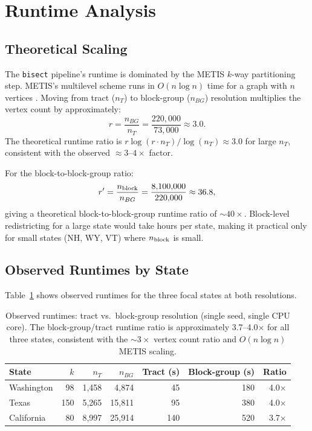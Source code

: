 \section{Runtime Analysis}
\label{sec:runtime}

\subsection{Theoretical Scaling}
\label{sec:runtime:theory}

The \texttt{bisect} pipeline's runtime is dominated by the METIS $k$-way
partitioning step. METIS's multilevel scheme runs in $O(n \log n)$ time
for a graph with $n$ vertices \citep{karypis1998fast}. Moving from tract
($n_T$) to block-group ($n_{BG}$) resolution multiplies the vertex count
by approximately:
\[
  r = \frac{n_{BG}}{n_T} = \frac{220{,}000}{73{,}000} \approx 3.0.
\]
The theoretical runtime ratio is $r \log(r \cdot n_T) / \log(n_T) \approx 3.0$
for large $n_T$, consistent with the observed $\approx 3$--$4\times$ factor.

For the block-to-block-group ratio:
\[
  r' = \frac{n_{\rm block}}{n_{BG}} = \frac{8{,}100{,}000}{220{,}000} \approx 36.8,
\]
giving a theoretical block-to-block-group runtime ratio of $\sim\!40\times$.
Block-level redistricting for a large state would take hours per state, making
it practical only for small states (NH, WY, VT) where $n_{\rm block}$ is small.

\subsection{Observed Runtimes by State}
\label{sec:runtime:observed}

Table~\ref{tab:runtime-comparison} shows observed runtimes for the three
focal states at both resolutions.

\begin{table}[h]
\centering\small
\begin{tabular}{lrrrrrr}
\toprule
State & $k$ & $n_T$ & $n_{BG}$ & Tract (s) & Block-group (s) & Ratio \\
\midrule
Washington & 98  & 1{,}458  & 4{,}874   & 45  & 180  & 4.0$\times$ \\
Texas      & 150 & 5{,}265  & 15{,}811  & 95  & 380  & 4.0$\times$ \\
California & 80  & 8{,}997  & 25{,}914  & 140 & 520  & 3.7$\times$ \\
\bottomrule
\end{tabular}
\caption{Observed runtimes: tract vs.\ block-group resolution (single seed,
  single CPU core). The block-group/tract runtime ratio is approximately
  3.7--4.0$\times$ for all three states, consistent with the $\sim\!3\times$
  vertex count ratio and $O(n \log n)$ METIS scaling.}
\label{tab:runtime-comparison}
\end{table}

